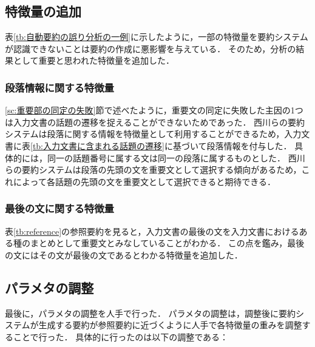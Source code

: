 \subsection{特徴量の追加}
\label{sc:特徴量の追加}

表\ref{tb:自動要約の誤り分析の一例}に示したように，一部の特徴量を要約システムが認識できないことは要約の作成に悪影響を与えている．
そのため，分析の結果として重要と思われた特徴量を追加した．


\subsubsection{段落情報に関する特徴量}
\label{段落情報に関する特徴量}

\ref{sc:重要部の同定の失敗}節で述べたように，重要文の同定に失敗した主因の1つは入力文書の話題の遷移を捉えることができないためであった．
西川らの要約システムは段落に関する情報を特徴量として利用することができるため，入力文書に表\ref{tb:入力文書に含まれる話題の遷移}に基づいて段落情報を付与した．
具体的には，同一の話題番号に属する文は同一の段落に属するものとした．
西川らの要約システムは段落の先頭の文を重要文として選択する傾向があるため，これによって各話題の先頭の文を重要文として選択できると期待できる．


\subsubsection{最後の文に関する特徴量}
\label{最後の文に関する特徴量}

表\ref{tb:reference}の参照要約を見ると，入力文書の最後の文を入力文書におけるある種のまとめとして重要文とみなしていることがわかる．
この点を鑑み，最後の文にはその文が最後の文であるとわかる特徴量を追加した．


\subsection{パラメタの調整}
\label{sc:パラメタの調整}

最後に，パラメタの調整を人手で行った．
パラメタの調整は，調整後に要約システムが生成する要約が参照要約に近づくように人手で各特徴量の重みを調整することで行った．
具体的に行ったのは以下の調整である：

